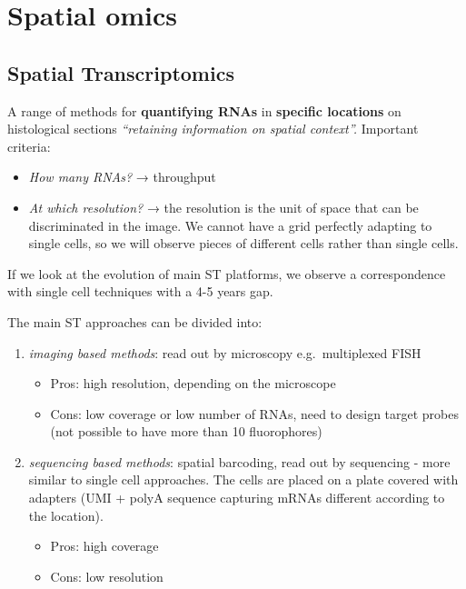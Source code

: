 \graphicspath{{chapters/05/}}
\chapter{Spatial omics}

\hypertarget{spatial-transcriptomics}{%
\section{Spatial
Transcriptomics}\label{spatial-transcriptomics}}

A range of methods for \textbf{quantifying RNAs} in \textbf{specific
locations} on histological sections \emph{``retaining information on
spatial context''.} Important criteria:

\begin{itemize}
\tightlist
\item
  \emph{How many RNAs?} → throughput
\item
  \emph{At which resolution?} → the resolution is the unit of space that
  can be discriminated in the image. We cannot have a grid perfectly
  adapting to single cells, so we will observe pieces of different cells
  rather than single cells.
\end{itemize}

If we look at the evolution of main ST platforms, we observe a
correspondence with single cell techniques with a 4-5 years gap.

The main ST approaches can be divided into:
\begin{enumerate}
\def\labelenumi{\arabic{enumi}.}
\tightlist
\item
  \emph{imaging based methods}: read out by microscopy e.g.~multiplexed
  FISH

  \begin{itemize}
  \tightlist
  \item
    Pros: high resolution, depending on the microscope
  \item
    Cons: low coverage or low number of RNAs, need to design target
    probes (not possible to have more than 10 fluorophores)
  \end{itemize}
\item
  \emph{sequencing based methods}: spatial barcoding, read out by
  sequencing - more similar to single cell approaches. The cells are
  placed on a plate covered with adapters (UMI + polyA sequence
  capturing mRNAs different according to the location).

  \begin{itemize}
  \tightlist
  \item
    Pros: high coverage
  \item
    Cons: low resolution
  \end{itemize}
\end{enumerate}


